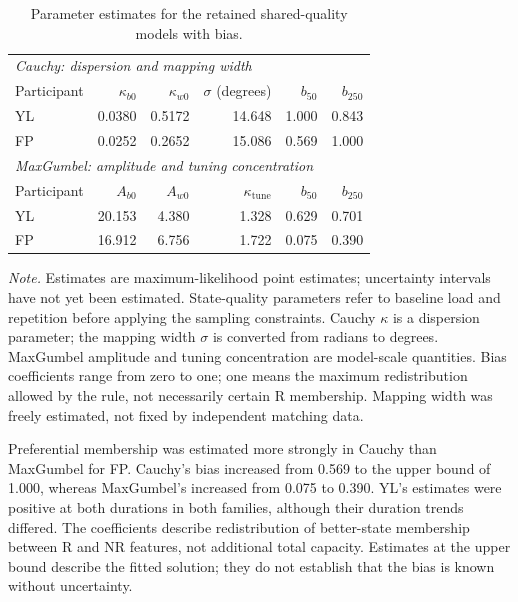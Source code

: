 \begin{table}[htbp]
\centering
\caption{Parameter estimates for the retained shared-quality models with bias.}
\label{tab:exp3_parameter_estimates}
\begin{tabular}{lrrrrr}
\hline
\multicolumn{6}{l}{\textit{Cauchy: dispersion and mapping width}} \\
Participant & $\kappa_{b0}$ & $\kappa_{w0}$ & $\sigma$ (degrees) & $b_{50}$ & $b_{250}$ \\
YL & 0.0380 & 0.5172 & 14.648 & 1.000 & 0.843 \\
FP & 0.0252 & 0.2652 & 15.086 & 0.569 & 1.000 \\
\hline
\multicolumn{6}{l}{\textit{MaxGumbel: amplitude and tuning concentration}} \\
Participant & $A_{b0}$ & $A_{w0}$ & $\kappa_{\mathrm{tune}}$ & $b_{50}$ & $b_{250}$ \\
YL & 20.153 & 4.380 & 1.328 & 0.629 & 0.701 \\
FP & 16.912 & 6.756 & 1.722 & 0.075 & 0.390 \\
\hline
\end{tabular}
\par\smallskip
\begin{minipage}{0.97\linewidth}
\small\textit{Note.} Estimates are maximum-likelihood point estimates; uncertainty intervals have not yet been estimated. State-quality parameters refer to baseline load and repetition before applying the sampling constraints. Cauchy $\kappa$ is a dispersion parameter; the mapping width $\sigma$ is converted from radians to degrees. MaxGumbel amplitude and tuning concentration are model-scale quantities. Bias coefficients range from zero to one; one means the maximum redistribution allowed by the rule, not necessarily certain R membership. Mapping width was freely estimated, not fixed by independent matching data.
\end{minipage}
\end{table}

Preferential membership was estimated more strongly in Cauchy than MaxGumbel for FP. Cauchy's bias increased from 0.569 to the upper bound of 1.000, whereas MaxGumbel's increased from 0.075 to 0.390. YL's estimates were positive at both durations in both families, although their duration trends differed. The coefficients describe redistribution of better-state membership between R and NR features, not additional total capacity. Estimates at the upper bound describe the fitted solution; they do not establish that the bias is known without uncertainty.

